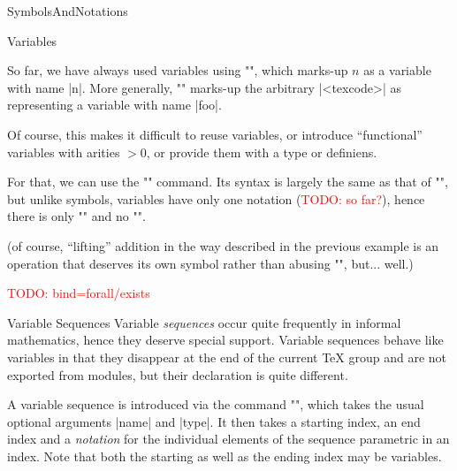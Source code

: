 \begin{smodule}[ns=https://github.com/slatex/sTeX/doc]{SymbolsAndNotations}
\begin{sfragment}{Variables}
  \begin{function}{\svar}
    So far, we have always used variables using \stexcode"", which marks-up $n$ as
    a variable with name |n|. More generally, \stexcode"" marks-up
    the arbitrary |<texcode>| as representing a variable with name |foo|.
  \end{function}

  Of course, this makes it difficult to reuse variables, or introduce ``functional''
  variables with arities $>0$, or provide them with a type or definiens.

  \begin{function}{\vardef}
    For that, we can use the \stexcode"\vardef" command. Its syntax is largely the same as
    that of \stexcode"\symdef", but unlike symbols, variables have only one notation
    (\textcolor{red}{TODO: so far?}), hence there is only \stexcode"\vardef" and no
    \stexcode"\vardecl".
  \end{function}


(of course, ``lifting'' addition in the way described in the previous example is an
operation that deserves its own symbol rather than abusing \stexcode"\addition",
but... well.)

\textcolor{red}{TODO: bind=forall/exists}
\end{sfragment}

\begin{sfragment}{Variable Sequences}
  Variable \emph{sequences} occur quite frequently in informal mathematics, hence they
  deserve special support. Variable sequences behave like variables in that they disappear
  at the end of the current \TeX\xspace group and are not exported from modules, but their
  declaration is quite different.

  \begin{function}{\varseq}
    A variable sequence is introduced via the command \stexcode"\varseq", which takes the
    usual optional arguments |name| and |type|. It then takes a starting index, an end
    index and a \emph{notation} for the individual elements of the sequence parametric in
    an index. Note that both the starting as well as the ending index may be variables.
  \end{function}


\end{sfragment}
\end{smodule}
